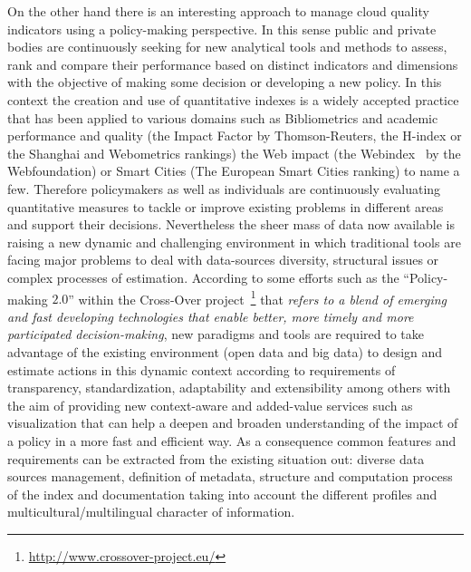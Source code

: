 On the other hand there is an interesting approach to manage cloud quality indicators using a policy-making 
perspective. In this sense public and private bodies are continuously seeking for new analytical tools and methods to 
assess, rank and compare their performance based on distinct indicators and dimensions with the objective of making 
some decision or developing a new policy. In this context the creation and use of quantitative indexes is 
a widely accepted practice that has been applied to various domains such as Bibliometrics and academic performance and 
quality (the Impact Factor by Thomson-Reuters, the H-index or the Shanghai and Webometrics rankings) the Web impact (the Webindex~\cite{webindexlod} 
by the Webfoundation) or Smart Cities (The European Smart Cities ranking) to name a few. Therefore policymakers as well as individuals are 
continuously evaluating quantitative measures to tackle or improve existing problems in different areas and 
support their decisions. Nevertheless the sheer mass of data now available is raising a new dynamic and challenging environment 
in which traditional tools are facing major problems to deal with data-sources diversity, structural issues or complex processes of estimation. 
According to some efforts such as the ``Policy-making $2.0$'' within the Cross-Over project~\footnote{\url{http://www.crossover-project.eu/}} 
that \textit{refers to a blend of emerging and fast developing technologies that enable better, more timely and more participated decision-making}, 
new paradigms and tools are required to take advantage of the existing environment (open data and big data) to design and estimate 
actions in this dynamic context according to requirements of transparency, standardization, adaptability and extensibility among 
others with the aim of providing new context-aware and added-value services such as visualization that 
can help a deepen and broaden understanding of the impact of a policy in a more fast and efficient way. 
As a consequence common features and requirements can be extracted from the existing situation out: diverse data sources management, 
definition of metadata, structure and computation process of the index and documentation taking into account the different 
profiles and multicultural/multilingual character of information.

